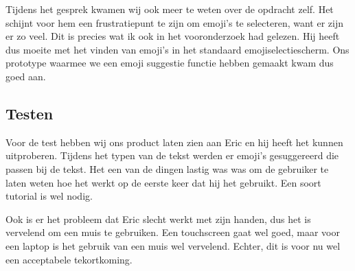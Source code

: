 \documentclass[12pt]{article}
\begin{document}
Tijdens het gesprek kwamen wij ook meer te weten over de opdracht zelf.
Het schijnt voor hem een frustratiepunt te zijn om emoji's te selecteren, want er zijn er zo veel.
Dit is precies wat ik ook in het vooronderzoek had gelezen.
Hij heeft dus moeite met het vinden van emoji's in het standaard emojiselectiescherm.
Ons prototype waarmee we een emoji suggestie functie hebben gemaakt kwam dus goed aan.

\subsection{Testen}

Voor de test hebben wij ons product laten zien aan Eric en hij heeft het kunnen uitproberen.
Tijdens het typen van de tekst werden er emoji's gesuggereerd die passen bij de tekst.
Het een van de dingen lastig was was om de gebruiker te laten weten hoe het werkt op de eerste keer dat hij het gebruikt.
Een soort tutorial is wel nodig.

Ook is er het probleem dat Eric slecht werkt met zijn handen, dus het is vervelend om een muis te gebruiken.
Een touchscreen gaat wel goed, maar voor een laptop is het gebruik van een muis wel vervelend.
Echter, dit is voor nu wel een acceptabele tekortkoming.









\end{document}
